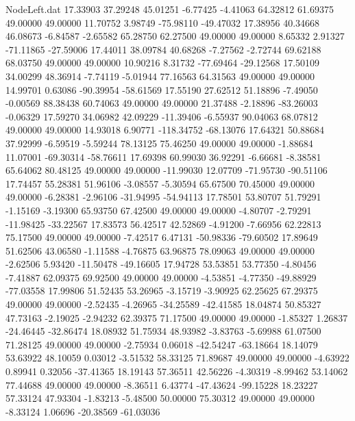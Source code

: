 \begin{filecontents}{NodeLeft.dat}
  17.33903   37.29248   45.01251    -6.77425   -4.41063   64.32812   61.69375   49.00000   49.00000   11.70752    3.98749  -75.98110  -49.47032
  17.38956   40.34668   46.08673    -6.84587   -2.65582   65.28750   62.27500   49.00000   49.00000    8.65332    2.91327  -71.11865  -27.59006
  17.44011   38.09784   40.68268    -7.27562   -2.72744   69.62188   68.03750   49.00000   49.00000   10.90216    8.31732  -77.69464  -29.12568
  17.50109   34.00299   48.36914    -7.74119   -5.01944   77.16563   64.31563   49.00000   49.00000   14.99701    0.63086  -90.39954  -58.61569
  17.55190   27.62512   51.18896    -7.49050   -0.00569   88.38438   60.74063   49.00000   49.00000   21.37488   -2.18896  -83.26003   -0.06329
  17.59270   34.06982   42.09229   -11.39406   -6.55937   90.04063   68.07812   49.00000   49.00000   14.93018    6.90771 -118.34752  -68.13076
  17.64321   50.88684   37.92999    -6.59519   -5.59244   78.13125   75.46250   49.00000   49.00000   -1.88684   11.07001  -69.30314  -58.76611
  17.69398   60.99030   36.92291    -6.66681   -8.38581   65.64062   80.48125   49.00000   49.00000  -11.99030   12.07709  -71.95730  -90.51106
  17.74457   55.28381   51.96106    -3.08557   -5.30594   65.67500   70.45000   49.00000   49.00000   -6.28381   -2.96106  -31.94995  -54.94113
  17.78501   53.80707   51.79291    -1.15169   -3.19300   65.93750   67.42500   49.00000   49.00000   -4.80707   -2.79291  -11.98425  -33.22567
  17.83573   56.42517   42.52869    -4.91200   -7.66956   62.22813   75.17500   49.00000   49.00000   -7.42517    6.47131  -50.98336  -79.60502
  17.89649   51.62506   43.06580    -1.11588   -4.76875   63.96875   78.09063   49.00000   49.00000   -2.62506    5.93420  -11.50478  -49.16605
  17.94728   53.53851   53.77350    -4.80456   -7.41887   62.09375   69.92500   49.00000   49.00000   -4.53851   -4.77350  -49.88929  -77.03558
  17.99806   51.52435   53.26965    -3.15719   -3.90925   62.25625   67.29375   49.00000   49.00000   -2.52435   -4.26965  -34.25589  -42.41585
  18.04874   50.85327   47.73163    -2.19025   -2.94232   62.39375   71.17500   49.00000   49.00000   -1.85327    1.26837  -24.46445  -32.86474
  18.08932   51.75934   48.93982    -3.83763   -5.69988   61.07500   71.28125   49.00000   49.00000   -2.75934    0.06018  -42.54247  -63.18664
  18.14079   53.63922   48.10059     0.03012   -3.51532   58.33125   71.89687   49.00000   49.00000   -4.63922    0.89941    0.32056  -37.41365
  18.19143   57.36511   42.56226    -4.30319   -8.99462   53.14062   77.44688   49.00000   49.00000   -8.36511    6.43774  -47.43624  -99.15228
  18.23227   57.33124   47.93304    -1.83213   -5.48500   50.00000   75.30312   49.00000   49.00000   -8.33124    1.06696  -20.38569  -61.03036

\end{filecontents}
